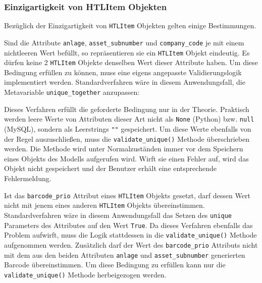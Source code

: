\hypertarget{einzigartigkeit-von-htlitem-objekten}{%
\subsubsection{Einzigartigkeit von HTLItem
Objekten}\label{einzigartigkeit-von-htlitem-objekten}}

Bezüglich der Einzigartigkeit von \texttt{HTLItem} Objekten gelten
einige Bestimmungen.

Sind die Attribute \texttt{anlage}, \texttt{asset\_subnumber} und
\texttt{company\_code} je mit einem nichtleeren Wert befüllt, so
repräsentieren sie ein \texttt{HTLItem} Objekt eindeutig. Es dürfen
keine 2 \texttt{HTLItem} Objekte denselben Wert dieser Attribute haben.
Um diese Bedingung erfüllen zu können, muss eine eigens angepasste
Validierungslogik implementiert werden. Standardverfahren wäre in diesem
Anwendungsfall, die Metavariable \texttt{unique\_together}
\cite{django-doku-models-options} anzupassen:

\begin{Shaded}
\begin{Highlighting}[]
\OperatorTok{=}\NormalTok{ [[}\NormalTok{,  }\NormalTok{, }\NormalTok{]]}
\end{Highlighting}
\end{Shaded}

Dieses Verfahren erfüllt die geforderte Bedingung nur in der Theorie.
Praktisch werden leere Werte von Attributen dieser Art nicht als
\texttt{None} (Python) bzw. \texttt{null} (MySQL), sondern als
Leerstrings \texttt{""} gespeichert. Um diese Werte ebenfalls von der
Regel auszuschließen, muss die \texttt{validate\_unique()} Methode
\cite{django-doku-models-instances} überschrieben werden. Die Methode
wird unter Normalzuständen immer vor dem Speichern eines Objekts des
Modells aufgerufen wird. Wirft sie einen Fehler auf, wird das Objekt
nicht gespeichert und der Benutzer erhält eine entsprechende
Fehlermeldung.

Ist das \texttt{barcode\_prio} Attribut eines \texttt{HTLItem} Objekts
gesetzt, darf dessen Wert nicht mit jenem eines anderen \texttt{HTLItem}
Objekts übereinstimmen. Standardverfahren wäre in diesem Anwendungsfall
das Setzen des \texttt{unique} Parameters des Attributes auf den Wert
\texttt{True}. Da dieses Verfahren ebenfalls das \oa{} Problem aufwirft,
muss die Logik stattdessen in die \texttt{validate\_unique()} Methode
aufgenommen werden. Zusätzlich darf der Wert des \texttt{barcode\_prio}
Attributs nicht mit dem aus den beiden Attributen \texttt{anlage} und
\texttt{asset\_subnumber} generierten Barcode übereinstimmen. Um diese
Bedingung zu erfüllen kann nur die \texttt{validate\_unique()} Methode
herbeigezogen werden.

